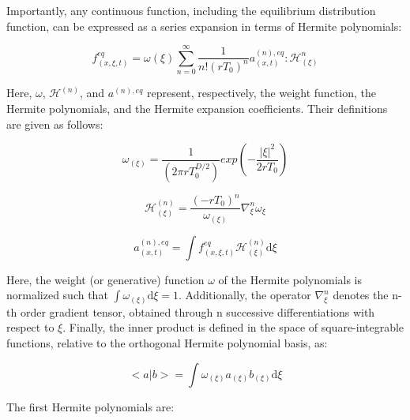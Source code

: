 Importantly, any continuous function, including the equilibrium distribution
function, can be expressed as a series expansion in terms of Hermite
polynomials: 

\begin{equation}
	f^{eq}_{(x,\xi,t)} = \omega(\xi)\sum_{n=0}^{\infty}\frac{1}{n!(rT_0)^n}a^{(n),eq}_{(x,t)}:\mathcal{H}^n_{(\xi)}
	\label{equilibrium distribution function}
\end{equation}

Here, $\omega$, $\mathcal{H}^(n)$, and $a^{(n),eq}$ represent, respectively, the
weight function, the Hermite polynomials, and the Hermite expansion
coefficients. Their definitions are given as follows:

\begin{equation}
	\omega_{(\xi)} = \frac{1}{(2\pi rT_0^{D/2})}exp\left(-\frac{|\xi|^2}{2rT_0}\right)
\end{equation}

\begin{equation}
	\mathcal{H}^{(n)}_{(\xi)} = \frac{(-rT_0)^n}{\omega_(\xi)}\nabla_{\xi}^n\omega_{\xi}
\end{equation}

\begin{equation}
	a^{(n),eq}_{(x,t)} = \int f^{eq}_{(x,\xi,t)}\mathcal{H}^{(n)}_{(\xi)}\mathrm{d}\xi
	\label{a_eq equation}
\end{equation}

Here, the weight (or generative) function $\omega$ of the Hermite polynomials is
normalized such that $\int\omega_{(\xi)}\mathrm{d}\xi=1$. Additionally, the
operator $\nabla_\xi^n$ denotes the n-th order gradient tensor, obtained through
n successive differentiations with respect to $\xi$. Finally, the inner product
is defined in the space of square-integrable functions, relative to the
orthogonal Hermite polynomial basis, as:

\begin{equation}
	<a|b> = \int\omega_{(\xi)}a_{(\xi)}b_{(\xi)}\mathrm{d}\xi
\end{equation}

The first Hermite polynomials are:

